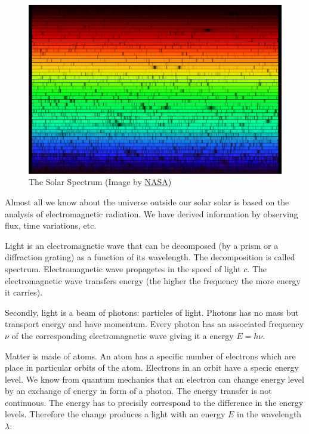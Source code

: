 \begin{figure}
	\includegraphics[width=\textwidth]{img/solarspectrum.jpg}
	\caption{The Solar Spectrum (Image by \href{https://solarsystem.nasa.gov/resources/390/the-solar-spectrum/}{NASA})}
	\label{solar_spectrum}
\end{figure}

Almost all we know about the universe outside our solar solar is based on the analysis of electromagnetic radiation.
We have derived information by observing flux, time variations, etc.~\cite{appenzeller2012}

Light is an electromagnetic wave that can be decomposed (by a prism or a diffraction grating) as a function of its wavelength.
The decomposition is called spectrum.
Electromagnetic wave propagetes in the speed of light \(c\).
The electromagnetic wave transfers energy
(the higher the frequency the more energy it carries).~\cite{cochard2018}

Secondly, light is a beam of photons: particles of light.
Photons has no mass but transport energy and have momentum.
Every photon has an associated frequency \(\nu\) of the corresponding electromagnetic wave giving it a energy \(E = h \nu\).

Matter is made of atoms.
An atom has a specific number of electrons which are place in particular orbits of the atom.
Electrons in an orbit have a specic energy level.
We know from quantum mechanics that an electron can change energy level by an exchange of energy in form of a photon.
The energy transfer is not continuous.
The energy has to precisily correspond to the difference in the energy levels.
Therefore the change produces a light with an energy \(E\) in the wavelength \(\lambda\):

